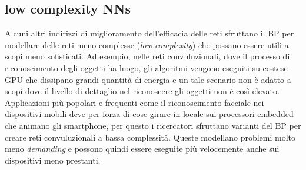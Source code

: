 \subsection*{low complexity NNs}
Alcuni altri indirizzi di miglioramento dell'efficacia delle reti sfruttano il BP per modellare delle reti meno complesse (\textit{low complexity}) che possano essere utili a scopi meno sofisticati. Ad esempio, nelle reti convuluzionali, dove il processo di riconoscimento degli oggetti ha luogo, gli algoritmi vengono eseguiti su costese GPU che dissipano grandi quantità di energia e un tale scenario non è adatto a scopi dove il livello di dettaglio nel riconoscere gli oggetti non è così elevato. Applicazioni più popolari e frequenti come il riconoscimento facciale nei dispositivi mobili deve per forza di cose girare in locale sui processori embedded che animano gli smartphone, per questo i ricercatori sfruttano varianti del BP per creare reti convuluzionali a bassa complessità. Queste modellano problemi molto meno \textit{demanding} e possono quindi essere eseguite più velocemente anche sui dispositivi meno prestanti\cite{TSD}.